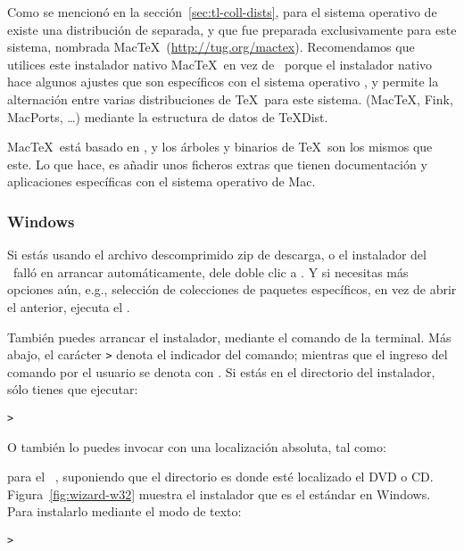 \documentclass{article}
\begin{document}
Como se mencionó en la sección~\ref{sec:tl-coll-dists}, para el
sistema operativo de \MacOSX existe una distribución de \TL{} separada, 
y que fue preparada exclusivamente para este sistema, nombrada
Mac\TeX\ (\url{http://tug.org/mactex}).  Recomendamos que utilices
este instalador nativo Mac\TeX\ en vez de \TL\, porque el instalador
nativo hace algunos ajustes que son específicos con el sistema
operativo \MacOSX, y permite la alternación entre varias
distribuciones de \TeX\ para este sistema. (Mac\TeX, Fink, MacPorts,
\ldots) mediante la estructura de datos de \TeX{}Dist.

Mac\TeX\ está basado en \TL, y los árboles y binarios de \TeX\ son los mismos que
este. Lo que hace, es añadir unos ficheros extras que tienen documentación y
aplicaciones específicas con el sistema operativo de Mac.

\subsubsection{Windows}\label{sec:wininst}

Si estás usando el archivo descomprimido zip de descarga, o el
instalador del \DVD\ falló en arrancar automáticamente, dele doble
clic a . Y si necesitas más opciones
aún, e.g., selección de colecciones de paquetes específicos, en vez de
abrir el anterior, ejecuta el . 

También puedes arrancar el instalador, mediante el comando de la
terminal. Más abajo, el carácter \texttt{>} denota el indicador del comando;
mientras que el ingreso del comando por el usuario se denota con
. Si estás en el directorio del instalador, sólo
tienes que ejecutar:
\begin{alltt}
	> 
\end{alltt}

O también lo puedes invocar con una localización absoluta, tal como:
\begin{alltt}
\end{alltt}
para el \TK\ \DVD, suponiendo que el directorio  es donde
esté localizado el \textsc{DVD} o \textsc{CD}.
Figura~\ref{fig:wizard-w32} muestra el instalador que es el estándar
en Windows. \\

Para instalarlo mediante el modo de texto:
\begin{alltt}
	> 
\end{alltt}
\end{document}
